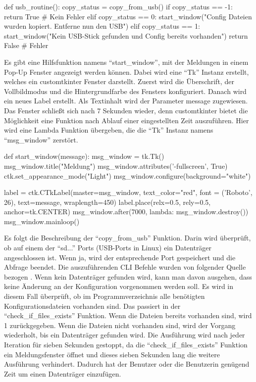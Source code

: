 \begin{pythoncode}
def usb_routine():
	copy_status = copy_from_usb()
	if copy_status == -1:
		return True # Kein Fehler
	elif copy_status == 0:
		start_window("Config Dateien wurden kopiert. Entferne nun den USB")   
	elif copy_status == 1: 
		start_window("Kein USB-Stick gefunden und Config bereits vorhanden")  
	return False # Fehler
\end{pythoncode}

Es gibt eine Hilfsfunktion namens \enquote{start\_window}, mit der Meldungen in einem Pop-Up Fenster angezeigt werden können. Dabei wird eine \enquote{Tk} Instanz erstellt, welches ein customtkinter Fenster darstellt. Zuerst wird die Überschrift, der Vollbildmodus und die Hintergrundfarbe des Fensters konfiguriert. Danach wird ein neues Label erstellt. Als Textinhalt wird der Parameter message zugewiesen. Das Fenster schließt sich nach 7 Sekunden wieder, denn customtkinter bietet die Möglichkeit eine Funktion nach Ablauf einer eingestellten Zeit auszuführen. Hier wird eine Lambda Funktion übergeben, die die \enquote{Tk} Instanz namens \enquote{msg\_window} zerstört.
\begin{pythoncode}
def start_window(message):
	msg_window = tk.Tk()
	msg_window.title("Meldung")
	msg_window.attributes('-fullscreen', True)	
	ctk.set_appearance_mode("Light")
	msg_window.configure(background="white")
	
	label = ctk.CTkLabel(master=msg_window, text_color="red", font = ('Roboto', 26), text=message, wraplength=450)
	label.place(relx=0.5, rely=0.5, anchor=tk.CENTER)
	msg_window.after(7000, lambda: msg_window.destroy())
	msg_window.mainloop()
\end{pythoncode}

Es folgt die Beschreibung der \enquote{copy\_from\_usb} Funktion. Darin wird überprüft, ob auf einem der \enquote{sd...} Ports (USB-Ports in Linux) ein Datenträger angeschlossen ist. Wenn ja, wird der entsprechende Port gespeichert und die Abfrage beendet. Die auszuführenden CLI Befehle wurden von folgender Quelle bezogen \cite{Rendek:2023}. Wenn kein Datenträger gefunden wird, kann man davon ausgehen, dass keine Änderung an der Konfiguration vorgenommen werden soll. Es wird in diesem Fall überprüft, ob im Programmverzeichnis alle benötigten Konfigurationsdateien vorhanden sind. Das passiert in der \enquote{check\_if\_files\_exists} Funktion. Wenn die Dateien bereits vorhanden sind, wird 1 zurückgegeben. Wenn die Dateien nicht vorhanden sind, wird der Vorgang wiederholt, bis ein Datenträger gefunden wird. Die Ausführung wird nach jeder Iteration für sieben Sekunden gestoppt, da die \enquote{check\_if\_files\_exists} Funktion ein Meldungsfenster öffnet und dieses sieben Sekunden lang die weitere Ausführung verhindert. Dadurch hat der Benutzer oder die Benutzerin genügend Zeit um einen Datenträger einzufügen.

